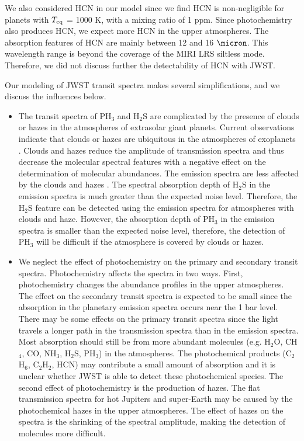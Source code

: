 \documentclass[twocolumn]{aastex61}
\begin{document}
We also considered HCN in our model since we find HCN is non-negligible for planets with $T_{\rm eq}$ = 1000 K, with a mixing ratio of 1 ppm. Since photochemistry also produces HCN, we expect more HCN in the upper atmospheres. The absorption features of HCN are mainly between 12 and 16 $\micron$. This wavelength range is beyond the coverage of the MIRI LRS siltless mode. Therefore, we did not discuss further the detectability of HCN with JWST. 

Our modeling of JWST transit spectra makes several simplifications, and we discuss the influences below. 

\begin{itemize}
\item The transit spectra of PH$_3$ and H$_2$S are complicated by the presence of clouds or hazes in the atmospheres of extrasolar giant planets. Current observations indicate that clouds or hazes are ubiquitous in the atmospheres of exoplanets \citep[e.g.][]{Pont08,Deming13,Kreidberg14a}. Clouds and hazes reduce the amplitude of transmission spectra and thus decrease the molecular spectral features with a negative effect on the determination of molecular abundances. The emission spectra are less affected by the clouds and hazes \citep[e.g.,][]{Line16}. The spectral absorption depth of H$_2$S in the emission spectra is much greater than the expected noise level. Therefore, the H$_2$S feature can be detected using the emission spectra for atmospheres with clouds and haze. However, the absorption depth of PH$_3$ in the emission spectra is smaller than the expected noise level, therefore, the detection of PH$_3$ will be difficult if the atmosphere is covered by clouds or hazes. 

\item We neglect the effect of photochemistry on the primary and secondary transit spectra. Photochemistry affects the spectra in two ways. First, photochemistry changes the abundance profiles in the upper atmospheres. The effect on the secondary transit spectra is expected to be small since the absorption in the planetary emission spectra occurs near the 1 bar level. There may be some effects on the primary transit spectra since the light travels a longer path in the transmission spectra than in the emission spectra. Most absorption should still be from more abundant molecules (e.g. H$_2$O, CH$_4$, CO, NH$_3$, H$_2$S, PH$_3$) in the atmospheres. The photochemical products (C$_2$H$_6$, C$_2$H$_2$, HCN) may contribute a small amount of absorption and it is unclear whether JWST is able to detect these photochemical species. The second effect of photochemistry is the production of hazes. The flat transmission spectra for hot Jupiters and super-Earth may be caused by the photochemical hazes in the upper atmospheres. The effect of hazes on the spectra is the 
shrinking of the spectral amplitude, making the detection of molecules more difficult.


\end{itemize}
\end{document}
